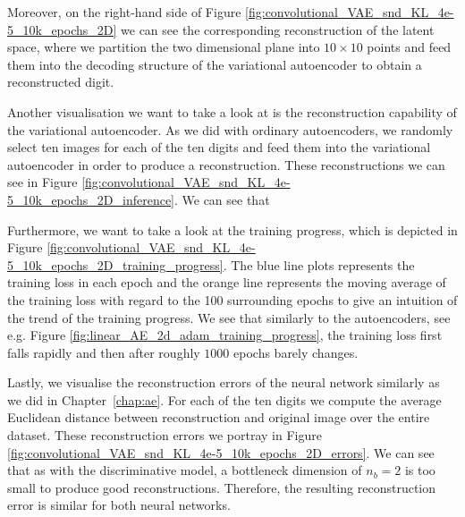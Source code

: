 Moreover, on the right-hand side of Figure \ref{fig:convolutional_VAE_snd_KL_4e-5_10k_epochs_2D} we can see the corresponding reconstruction of the latent space, where we partition the two dimensional plane into $10\times 10$ points and feed them into the decoding structure of the variational autoencoder to obtain a reconstructed digit.

Another visualisation we want to take a look at is the reconstruction capability of the variational autoencoder. As we did with ordinary autoencoders, we randomly select ten images for each of the ten digits and feed them into the variational autoencoder in order to produce a reconstruction. These reconstructions we can see in Figure \ref{fig:convolutional_VAE_snd_KL_4e-5_10k_epochs_2D_inference}. We can see that

Furthermore, we want to take a look at the training progress, which is depicted in Figure \ref{fig:convolutional_VAE_snd_KL_4e-5_10k_epochs_2D_training_progress}. The blue line plots represents the training loss in each epoch and the orange line represents the moving average of the training loss with regard to the 100 surrounding epochs to give an intuition of the trend of the training progress. We see that similarly to the autoencoders, see e.g. Figure \ref{fig:linear_AE_2d_adam_training_progress}, the training loss first falls rapidly and then after roughly $1000$ epochs barely changes.

Lastly, we visualise the reconstruction errors of the neural network similarly as we did in Chapter~\ref{chap:ae}. For each of the ten digits we compute the average Euclidean distance between reconstruction and original image over the entire dataset. These reconstruction errors we portray in Figure \ref{fig:convolutional_VAE_snd_KL_4e-5_10k_epochs_2D_errors}. We can see that as with the discriminative model, a bottleneck dimension of $n_b=2$ is too small to produce good reconstructions. Therefore, the resulting reconstruction error is similar for both neural networks.

